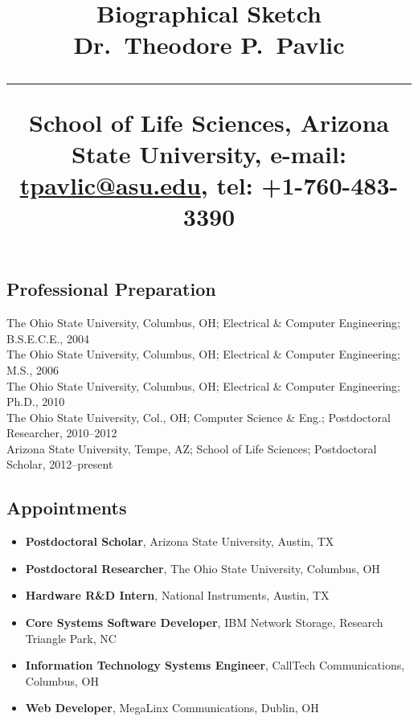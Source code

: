 \documentclass[svgnames,11pt]{article}
\title{%
        \vspace{-2\baselineskip}
            \normalsize
            Biographical Sketch\\
            {\large\textbf{Dr.~Theodore P.~Pavlic}}\\
            \vspace{0.5\baselineskip}
            \hrule
            \vspace{0.5\baselineskip}
            School of Life Sciences, Arizona State University,
            e-mail: \href{mailto:tpavlic@asu.edu}{tpavlic@asu.edu},
            tel: +1-760-483-3390
        \vspace{-1.5ex}
        }
\date{}
\author{}
\begin{document}
\maketitle
\vspace{-4\baselineskip}

\subsection{Professional Preparation}

    The Ohio State University, Columbus, OH;
        Electrical \& Computer Engineering;
        B.S.E.C.E., 2004
        \\
    The Ohio State University, Columbus, OH;
        Electrical \& Computer Engineering;
        M.S., 2006
        \\
    The Ohio State University, Columbus, OH;
        Electrical \& Computer Engineering;
        Ph.D., 2010
        \\
    The Ohio State University, Col., OH;
        Computer Science \& Eng.;
        Postdoctoral Researcher, 2010--2012
        \\
    Arizona State University, Tempe, AZ;
        School of Life Sciences;
        Postdoctoral Scholar, 2012--present

\subsection{Appointments}

\begin{itemize}[label={--9999:},leftmargin=*,itemsep=0pt]

    \item[2012--present:]
        \textbf{Postdoctoral Scholar},
        Arizona State University,
        Austin, TX

    \item[2010--2012:]
        \textbf{Postdoctoral Researcher},
        The Ohio State University,
        Columbus, OH

    \item[2002, 2003:]
        \textbf{Hardware R\&D Intern},
        National Instruments,
        Austin, TX

    \item[2001:]
        \textbf{Core Systems Software Developer},
        IBM Network Storage,
        Research Triangle Park, NC

    \item[1997--2001:]
        \textbf{Information Technology Systems Engineer},
        CallTech Communications,
        Columbus, OH

    \item[1995--1997:]
        \textbf{Web Developer},
        MegaLinx Communications,
        Dublin, OH

\end{itemize}
\end{document}

